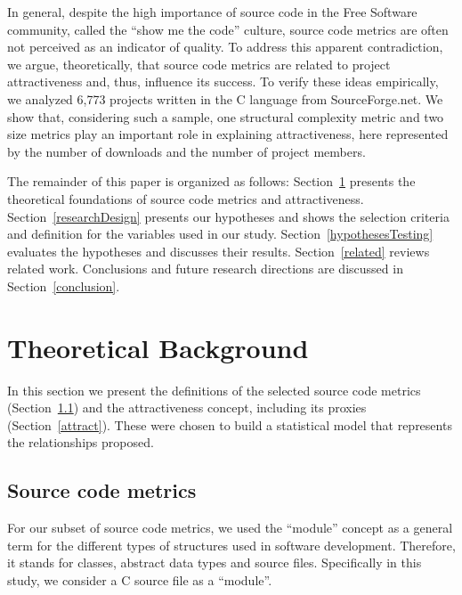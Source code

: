 \documentclass[conference]{IEEEtran}
\newcommand{\TODO}[1]{{\color{red}\textbf{\uwave{#1}}}}
\begin{document}
In general, despite the high importance of source code in the Free Software
community, called the ``show me the code'' culture, source code metrics are
often not perceived as an indicator of quality.
%
To address this apparent contradiction, we argue, theoretically, that source
code metrics are related to project attractiveness and, thus, influence its success.
%
To verify these ideas empirically, we analyzed 6,773 projects
written in the C language from SourceForge.net.
%
We show that, considering such a sample, one structural complexity metric
and two size metrics play an important role in explaining attractiveness,
here represented by the number of downloads and the number of project members.



The remainder of this paper is organized as follows:
%
Section~\ref{background} presents the theoretical foundations of source code
metrics and attractiveness.
%
Section~\ref{researchDesign} presents our hypotheses and shows the selection
criteria and definition for the variables used in our study.
%
Section~\ref{hypothesesTesting} evaluates the hypotheses and discusses 
their results.
%
Section~\ref{related} reviews related work.
%
Conclusions and future research directions are discussed in Section~\ref{conclusion}.

\section{Theoretical Background}
\label{background}

In this section we present the definitions of the selected source code metrics
(Section~\ref{scm}) and the attractiveness concept, including its proxies (Section~\ref{attract}).
These were chosen to build a statistical model that represents the relationships proposed.

\subsection{Source code metrics}
\label{scm}

For our subset of source code metrics, we used the ``module'' concept
as a general term for the different types of structures used in software
development. Therefore, it stands for classes, abstract data types and source files. 
%
Specifically in this study, we consider a C source file as a ``module''.
\end{document}
